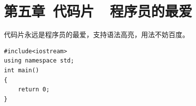 \documentclass{ctexart}
\begin{document}



\clearpage
\section{第五章\ 代码片\ \ 程序员的最爱}
代码片永远是程序员的最爱，支持语法高亮，用法不妨百度。\\
\lstset{language=C}
\begin{lstlisting}
#include<iostream>
using namespace std;
int main()
{
    return 0;
}
\end{lstlisting}

\end{document}

